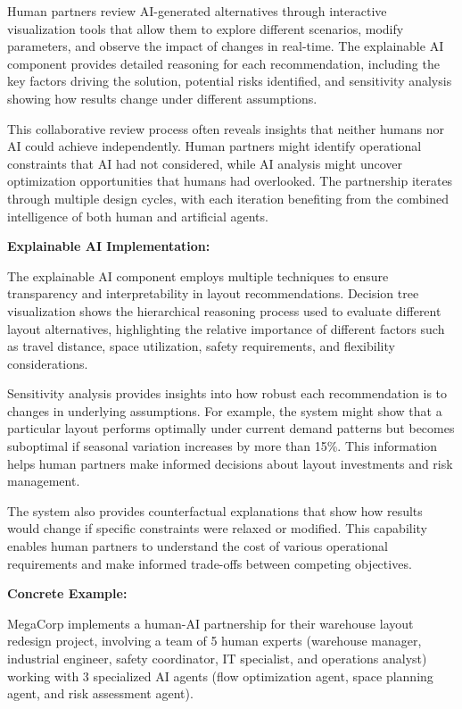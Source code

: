 \documentclass{article}
\begin{document}
Human partners review AI-generated alternatives through interactive visualization tools that allow them to explore different scenarios, modify parameters, and observe the impact of changes in real-time. The explainable AI component provides detailed reasoning for each recommendation, including the key factors driving the solution, potential risks identified, and sensitivity analysis showing how results change under different assumptions.

This collaborative review process often reveals insights that neither humans nor AI could achieve independently. Human partners might identify operational constraints that AI had not considered, while AI analysis might uncover optimization opportunities that humans had overlooked. The partnership iterates through multiple design cycles, with each iteration benefiting from the combined intelligence of both human and artificial agents.

\textbf{Explainable AI Implementation:}

The explainable AI component employs multiple techniques to ensure transparency and interpretability in layout recommendations. Decision tree visualization shows the hierarchical reasoning process used to evaluate different layout alternatives, highlighting the relative importance of different factors such as travel distance, space utilization, safety requirements, and flexibility considerations.

Sensitivity analysis provides insights into how robust each recommendation is to changes in underlying assumptions. For example, the system might show that a particular layout performs optimally under current demand patterns but becomes suboptimal if seasonal variation increases by more than 15\%. This information helps human partners make informed decisions about layout investments and risk management.

The system also provides counterfactual explanations that show how results would change if specific constraints were relaxed or modified. This capability enables human partners to understand the cost of various operational requirements and make informed trade-offs between competing objectives.

\textbf{Concrete Example:}

MegaCorp implements a human-AI partnership for their warehouse layout redesign project, involving a team of 5 human experts (warehouse manager, industrial engineer, safety coordinator, IT specialist, and operations analyst) working with 3 specialized AI agents (flow optimization agent, space planning agent, and risk assessment agent).
\end{document}
